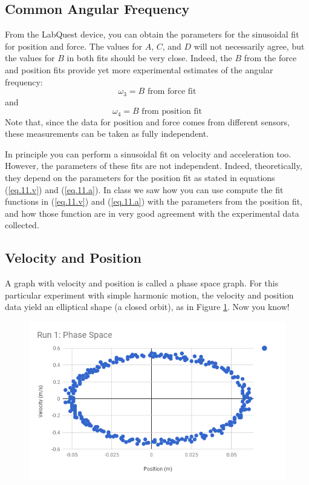 \subsection{Common Angular Frequency}
From the LabQuest device, you can obtain the parameters for the sinusoidal fit for position and force. The values for $A$, $C$, and $D$ will not necessarily agree, but the values for $B$ in both fits should be very close. Indeed, the $B$ from the force and position fits provide yet more experimental estimates of the angular frequency:
\begin{equation}
    \omega_{3} = B \text{ from force fit}
\end{equation}
and
\begin{equation}
    \omega_{4} = B \text{ from position fit}
\end{equation}
Note that, since the data for position and force comes from different sensors, these measurements can be taken as fully independent.

In principle you can perform a sinusoidal fit on velocity and acceleration too. However, the parameters of these fits are not independent. Indeed, theoretically, they depend on the parameters for the position fit as stated in equations (\ref{eq.11.v}) and (\ref{eq.11.a}). In class we saw how you can use compute the fit functions in (\ref{eq.11.v}) and (\ref{eq.11.a}) with the parameters from the position fit, and how those function are in very good agreement with the experimental data collected.
\subsection{Velocity and Position}
A graph with velocity and position is called a phase space graph. For this particular experiment with simple harmonic motion, the velocity and position data yield an elliptical shape (a closed orbit), as in Figure \ref{figure.11.phase}. Now you know!
\begin{figure}
    \centering
    \includegraphics[scale=0.71]{image/11-shm/phase.png}
    \caption{}
    \label{figure.11.phase}
\end{figure}
